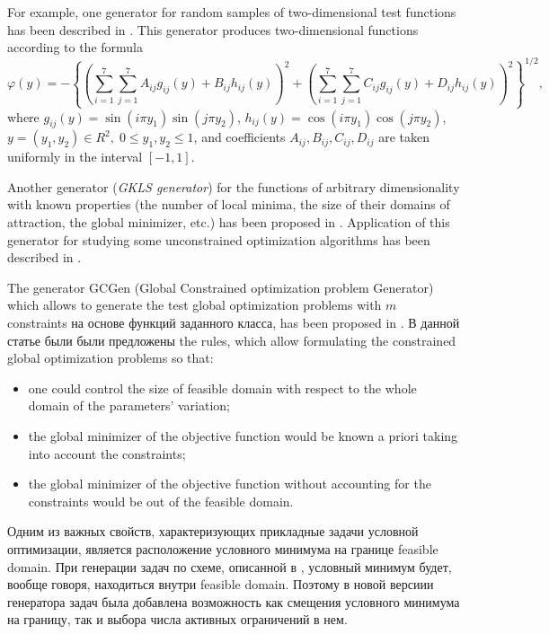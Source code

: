 \documentclass{aip-cp}
\begin{document}
For example, one generator for random samples of two-dimensional test functions has been described in \cite{Grishagin2015}. This generator produces two-dimensional functions according to the formula
\begin{equation} \label{VAG}
\varphi(y)= -\left\{\left(\sum^{7}_{i=1}\sum^{7}_{j=1}A_{ij}g_{ij}(y)+B_{ij}h_{ij}(y)\right)^2 + \left(\sum^{7}_{i=1}\sum^{7}_{j=1}C_{ij}g_{ij}(y)+D_{ij}h_{ij}(y)\right)^2\right\}^{1/2},
\end{equation}
where $g_{ij}(y)=\sin(i\pi y_1)\sin(j\pi y_2)$, $h_{ij}(y)=\cos(i\pi y_1)\cos(j\pi y_2)$, $y=(y_1,y_2)\in R^2, \; 0 \leq y_1,y_2 \leq 1$, and coefficients $A_{ij}, B_{ij}, C_{ij}, D_{ij}$  are taken uniformly in the interval $[-1,1]$.

Another generator (\textit{GKLS generator}) for the functions of arbitrary dimensionality with known properties (the number of local minima, the size of their domains of attraction, the global minimizer, etc.) has been proposed in \cite{Gaviano2003}.  Application of this generator for studying some unconstrained optimization algorithms has been described in \cite{Paulavicius2014,Sergeyev2015}. 



The generator GCGen (Global Constrained optimization problem Generator) which allows to generate the test global optimization problems with $m$ constraints на основе функций заданного класса, has been proposed in \cite{Gergel2017}. В данной статье были были предложены the rules, which allow formulating the constrained global optimization problems so that:
\begin{itemize}
	\item one could control the size of feasible domain with respect to the whole domain of the parameters' variation;
	\item the global minimizer of the objective function would be known a priori taking into account the constraints;
	\item the global minimizer of the objective function without accounting for the constraints would be out of the feasible domain.
\end{itemize}


\Russian
Одним из важных свойств, характеризующих прикладные задачи условной оптимизации, является расположение условного минимума на границе feasible domain. При генерации задач по схеме, описанной в \cite{Gergel2017}, условный минимум будет, вообще говоря, находиться внутри feasible domain. Поэтому в новой версиии генератора задач была добавлена возможность как смещения условного минимума на границу, так и выбора числа активных ограничений в нем.
\end{document}
